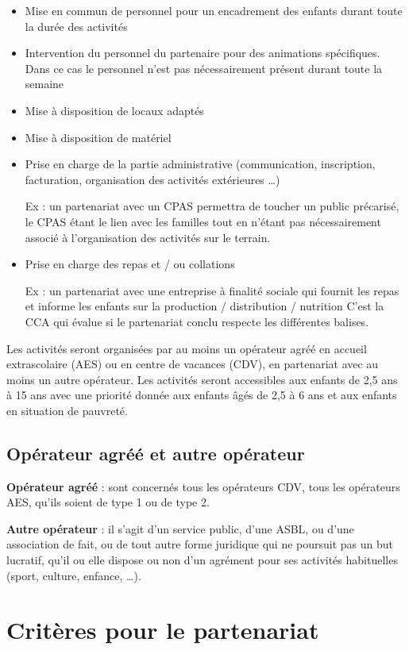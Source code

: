 \begin{itemize}
    \item Mise en commun de personnel pour un encadrement des enfants durant
toute la durée des activités
    \item Intervention du personnel du partenaire pour des animations spécifiques. Dans ce cas le personnel n’est pas nécessairement présent durant toute la semaine
    \item Mise à disposition de locaux adaptés
    \item Mise à disposition de matériel
    \item Prise en charge de la partie administrative (communication, inscription, facturation, organisation des activités extérieures …)
    
    Ex : un partenariat avec un CPAS permettra de toucher un public précarisé, le CPAS étant le lien avec les familles tout en n’étant pas nécessairement associé à l’organisation des activités sur le terrain.
    \item Prise en charge des repas et / ou collations
    
    Ex : un partenariat avec une entreprise à finalité sociale qui fournit les repas et informe les enfants sur la production / distribution / nutrition C’est la CCA qui évalue si le partenariat conclu respecte les différentes balises.
\end{itemize}

Les activités seront organisées par au moins un opérateur agréé en accueil extrascolaire (AES) ou en centre de vacances (CDV), en partenariat avec au moins un autre opérateur. Les activités seront accessibles aux enfants de 2,5 ans à 15 ans avec une priorité donnée aux enfants âgés de 2,5 à 6 ans et aux enfants en situation de pauvreté.

\subsection{Opérateur agréé et autre opérateur}
\textbf{Opérateur agréé }: sont concernés tous les opérateurs CDV, tous les opérateurs AES, qu’ils soient de type 1 ou de type 2.


\textbf{Autre opérateur} : il s’agit d’un service public, d’une ASBL, ou d’une association de fait, ou de tout autre forme juridique qui ne poursuit pas un but lucratif, qu’il ou elle dispose ou non d’un agrément pour ses activités habituelles (sport, culture, enfance, …). 




\section{Critères pour le partenariat}

